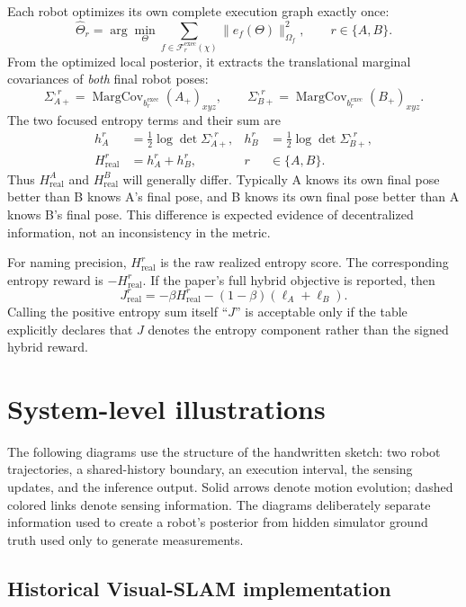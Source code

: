 \documentclass[11pt,a4paper]{article}
\begin{document}
Each robot optimizes its own complete execution graph exactly once:
\[
 \widehat\Theta_r
 =\arg\min_{\Theta}
   \sum_{f\in\mathcal F_r^{\mathrm{exec}}(\chi)}
   \lVert e_f(\Theta)\rVert^2_{\Omega_f},
 \qquad r\in\{A,B\}.
\]
From the optimized local posterior, it extracts the translational marginal
covariances of \emph{both} final robot poses:
\[
 \Sigma_{A+}^{,r}=\operatorname{MargCov}_{b_r^{\mathrm{exec}}}(A_+)_{xyz},
 \qquad
 \Sigma_{B+}^{,r}=\operatorname{MargCov}_{b_r^{\mathrm{exec}}}(B_+)_{xyz}.
\]
The two focused entropy terms and their sum are
\begin{align}
 h_A^r&=\tfrac12\log\det\Sigma_{A+}^{,r},
 &h_B^r&=\tfrac12\log\det\Sigma_{B+}^{,r},\\
 H_{\mathrm{real}}^r&=h_A^r+h_B^r,
 &r&\in\{A,B\}.
 \label{eq:definitive-realized-score}
\end{align}
Thus $H_{\mathrm{real}}^A$ and $H_{\mathrm{real}}^B$ will generally differ.
Typically A knows its own final pose better than B knows A's final pose, and B
knows its own final pose better than A knows B's final pose.  This difference
is expected evidence of decentralized information, not an inconsistency in the
metric.

For naming precision, $H_{\mathrm{real}}^r$ is the raw realized entropy score.
The corresponding entropy reward is $-H_{\mathrm{real}}^r$.  If the paper's
full hybrid objective is reported, then
\[
 J_{\mathrm{real}}^r
 =-\beta H_{\mathrm{real}}^r
  -(1-\beta)(\ell_A+\ell_B).
\]
Calling the positive entropy sum itself ``$J$'' is acceptable only if the table
explicitly declares that $J$ denotes the entropy component rather than the
signed hybrid reward.

\clearpage
\section{System-level illustrations}

The following diagrams use the structure of the handwritten sketch: two robot
trajectories, a shared-history boundary, an execution interval, the sensing
updates, and the inference output.  Solid arrows denote motion evolution;
dashed colored links denote sensing information.  The diagrams deliberately
separate information used to create a robot's posterior from hidden simulator
ground truth used only to generate measurements.

\subsection{Historical Visual-SLAM implementation}
\end{document}

